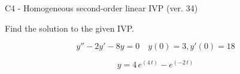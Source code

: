 \begin{exercise}
  \begin{exerciseTitle}C4 - Homogeneous second-order linear IVP (ver. 34)\end{exerciseTitle}
  \begin{exerciseStatement}
    
Find the solution to the given IVP.

    
\[y''-2y'-8y = 0 \hspace{1em} y(0) = 3 , y'(0) = 18\]

  \end{exerciseStatement}
  \begin{exerciseAnswer}
    
\[y= 4 \, e^{\left(4 \, t\right)} - e^{\left(-2 \, t\right)}\]

  \end{exerciseAnswer}
\end{exercise}